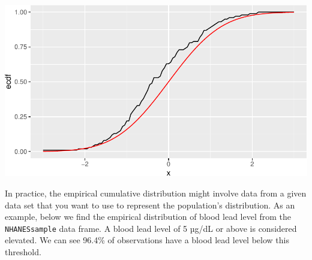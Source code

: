 \documentclass[
  letterpaper,
]{krantz}
\makeatletter
\newenvironment{Shaded}{\begin{snugshade}}{\end{snugshade}}
\newcommand{\AttributeTok}[1]{\textcolor[rgb]{0.40,0.45,0.13}{#1}}
\newcommand{\DecValTok}[1]{\textcolor[rgb]{0.68,0.00,0.00}{#1}}
\newcommand{\FloatTok}[1]{\textcolor[rgb]{0.68,0.00,0.00}{#1}}
\newcommand{\FunctionTok}[1]{\textcolor[rgb]{0.28,0.35,0.67}{#1}}
\newcommand{\NormalTok}[1]{\textcolor[rgb]{0.00,0.23,0.31}{#1}}
\newcommand{\OtherTok}[1]{\textcolor[rgb]{0.00,0.23,0.31}{#1}}
\newcommand{\SpecialCharTok}[1]{\textcolor[rgb]{0.37,0.37,0.37}{#1}}
\newcommand{\StringTok}[1]{\textcolor[rgb]{0.13,0.47,0.30}{#1}}
\newenvironment{kframe}{%
\medskip{}
\setlength{\fboxsep}{.8em}
 \def\at@end@of@kframe{}%
 \ifinner\ifhmode%
  \def\at@end@of@kframe{\end{minipage}}%
  \begin{minipage}{\columnwidth}%
 \fi\fi%
 \def\FrameCommand##1{\hskip\@totalleftmargin \hskip-\fboxsep
 \colorbox{shadecolor}{##1}\hskip-\fboxsep
     \hskip-\linewidth \hskip-\@totalleftmargin \hskip\columnwidth}%
 \MakeFramed {\advance\hsize-\width
   \@totalleftmargin\z@ \linewidth\hsize
   \@setminipage}}%
 {\par\unskip\endMakeFramed%
 \at@end@of@kframe}
\renewenvironment{Shaded}{\begin{kframe}}{\end{kframe}}
\makeatother
\begin{document}
\begin{Shaded}
\end{Shaded}

\begin{center}
\includegraphics[width=1\textwidth,height=\textheight]{book/distributions_files/figure-pdf/unnamed-chunk-24-1.pdf}
\end{center}

In practice, the empirical cumulative distribution might involve data
from a given data set that you want to use to represent the population's
distribution. As an example, below we find the empirical distribution of
blood lead level from the \texttt{NHANESsample} data frame. A blood lead
level of 5 µg/dL or above is considered elevated. We can see 96.4\% of
observations have a blood lead level below this threshold.
\end{document}
